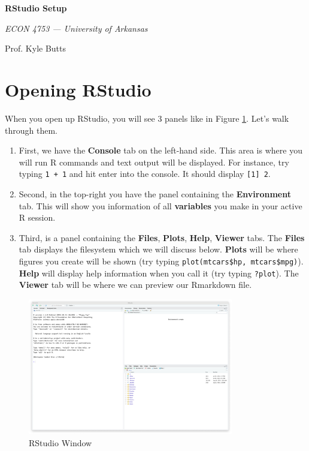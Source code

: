\documentclass[12pt]{article}
\begin{document}
\begin{center}
  {\Huge\bf RStudio Setup}
  
  \smallskip
  {\large\it ECON 4753 — University of Arkansas}

  \medskip
  {\large Prof. Kyle Butts}
\end{center}

\section*{Opening RStudio}

When you open up RStudio, you will see 3 panels like in Figure \ref{fig:rstudio}. Let's walk through them. 
\begin{enumerate}
  \item First, we have the \textbf{Console} tab on the left-hand side. This area is where you will run R commands and text output will be displayed. For instance, try typing \texttt{1 + 1} and hit enter into the console. It should display \texttt{[1] 2}.
  
  \item Second, in the top-right you have the panel containing the \textbf{Environment} tab. This will show you information of all \textbf{variables} you make in your active R session. 
  
  \item Third, is a panel containing the \textbf{Files}, \textbf{Plots}, \textbf{Help}, \textbf{Viewer} tabs. The \textbf{Files} tab displays the filesystem which we will discuss below. \textbf{Plots} will be where figures you create will be shown (try typing \texttt{plot(mtcars\$hp, mtcars\$mpg)}). \textbf{Help} will display help information when you call it (try typing \texttt{?plot}). The \textbf{Viewer} tab will be where we can preview our Rmarkdown file.
\end{enumerate}



\begin{figure}[!ht]
  \caption{RStudio Window}
  \label{fig:rstudio}
  \centering
  \includegraphics[width = 0.8\textwidth]{figures/rstudio.png}
\end{figure}
\end{document}
